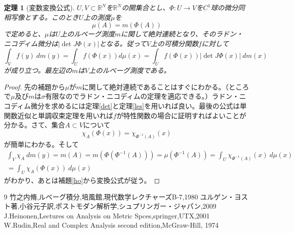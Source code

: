 \documentclass[leqno]{jsarticle}
\newtheorem{thm}{定理}
\newcommand{\rr}{\mathbb{R}}
\begin{document}
\begin{thm}[変数変換公式]
$U,V\subset \rr^N$を$\rr^N$の開集合とし、$\Phi:U\to V$を$C^1$球の微分同相写像とする。このとき$U$上の測度$\mu$を
\[
\mu(A)=m(\Phi(A))
\]
で定めると、$\mu$は$U$上のルベーグ測度$m$に関して絶対連続となり、そのラドン・ニコディム微分は$|\det J\Phi(x)|$となる。従って$V$上の可積分関数$f$に対して
\[
\int_{V}f(y)\ dm(y)=\int_{U}f(\Phi(x))d\mu(x)=\int_{U}f(\Phi(x))|\det J\Phi(x)|\ dm(x)
\]
が成り立つ。最左辺の$m$は$V$上のルベーグ測度である。
\end{thm}
\begin{proof}
先の補題から$\mu$が$m$に関して絶対連続であることはすぐにわかる。（ところで$\mu$及び$m$は$\sigma$有限なのでラドン・ニコディムの定理を適応できる。）ラドン・ニコディム微分を求めるには定理\ref{det}と定理\ref{les}を用いれば良い。最後の公式は単関数近似と単調収束定理を用いれば$f$が特性関数の場合に証明すればよいことが分かる。さて、集合$A\subset V$について
\[
\chi_A(\Phi(x))=\chi_{\Phi^{-1}(A)}(x)
\]
が簡単にわかる。そして
\begin{align*}
\int_{V}\chi_{A}\ dm(y)=m(A)=m(\Phi(\Phi^{-1}(A)))=\mu(\Phi^{-1}(A))=\int_{U}\chi_{\Phi^{-1}(A)}(x)\ d\mu(x)\\
=\int_{U}\chi_{A}(\Phi(x))\ d\mu(x)
\end{align*}
がわかり、あとは補題\ref{ho}から変換公式が従う。
\end{proof}










































	
\begin{thebibliography}{9}
竹之内脩,ルベーグ積分,培風館,現代数学レクチャーズB-7,1980
ユルゲン・ヨスト著,小谷元子訳,ポストモダン解析学,シュプリンガー・ジャパン,2009
J.Heinonen,Lectures on Analysis on Metric Spces,springer,UTX,2001
W.Rudin,Real and Complex Analysis second edition,McGraw-Hill, 1974

\end{thebibliography}




			
\end{document}
